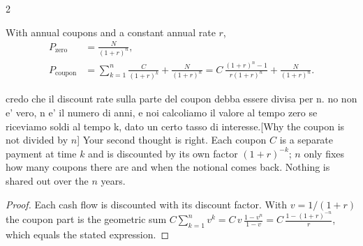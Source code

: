 \begin{paracol}{2}
\begin{proposition}\label{prop:bondprice}
With annual coupons and a constant annual rate $r$,
\begin{align}
  P_{\text{zero}} &= \frac{N}{(1+r)^n},\label{eq:zcb}\\
  P_{\text{coupon}} &= \sum_{k=1}^{n}\frac{C}{(1+r)^k} + \frac{N}{(1+r)^n}
   = C\,\frac{(1+r)^n-1}{r(1+r)^n} + \frac{N}{(1+r)^n}.\label{eq:couponbond}
\end{align}
\end{proposition} \begin{answer}{credo che il discount rate sulla parte del coupon debba essere divisa per n. no non e' vero, n e' il numero di anni, e noi calcoliamo il valore al tempo zero se riceviamo soldi al tempo k, dato un certo tasso di interesse.}[Why the coupon is not divided by $n$]
Your second thought is right. Each coupon $C$ is a separate payment at time $k$ and is discounted
by its own factor $(1+r)^{-k}$; $n$ only fixes how many coupons there are and when the notional comes
back. Nothing is shared out over the $n$ years.
\end{answer}
\begin{proof}
Each cash flow is discounted with its discount factor. With $v = 1/(1+r)$ the coupon part is the
geometric sum $C\sum_{k=1}^n v^k = C\,v\,\frac{1-v^n}{1-v} = C\,\frac{1-(1+r)^{-n}}{r}$, which equals
the stated expression.
\end{proof}


\end{paracol}
